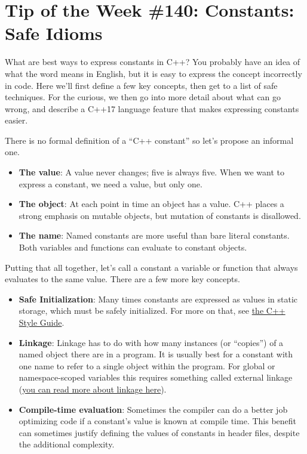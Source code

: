 
\chapter{Tip of the Week \#140: Constants: Safe Idioms}\label{ch:tip-of-the-week-140}

What are best ways to express constants in C++? You probably have an idea of what the word means in English, but it is easy to express the concept incorrectly in code. Here we’ll first define a few key concepts, then get to a list of safe techniques. For the curious, we then go into more detail about what can go wrong, and describe a C++17 language feature that makes expressing constants easier.

There is no formal definition of a \enquote{C++ constant} so let’s propose an informal one.
\begin{itemize}
    \item \textbf{The value}: A value never changes; five is always five. When we want to express a constant, we need a value, but only one.
    \item \textbf{The object}: At each point in time an object has a value. C++ places a strong emphasis on mutable objects, but mutation of constants is disallowed.
    \item \textbf{The name}: Named constants are more useful than bare literal constants. Both variables and functions can evaluate to constant objects.
\end{itemize}
Putting that all together, let’s call a constant a variable or function that always evaluates to the same value. There are a few more key concepts.
\begin{itemize}
    \item \textbf{Safe Initialization}: Many times constants are expressed as values in static storage, which must be safely initialized. For more on that, see \hyperref[sec:static-and-global-variables]{the C++ Style Guide}.
    \item \textbf{Linkage}: Linkage has to do with how many instances (or \enquote{copies}) of a named object there are in a program. It is usually best for a constant with one name to refer to a single object within the program. For global or namespace-scoped variables this requires something called external linkage (\href{http://en.cppreference.com/w/cpp/language/storage_duration}{you can read more about linkage here}).
    \item \textbf{Compile-time evaluation}: Sometimes the compiler can do a better job optimizing code if a constant’s value is known at compile time. This benefit can sometimes justify defining the values of constants in header files, despite the additional complexity.
\end{itemize}

